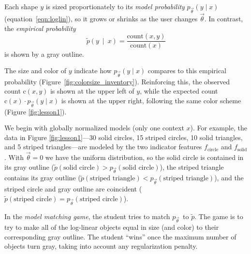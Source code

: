 \documentclass[11pt,letterpaper]{article}
\newcommand{\Note}[1]{}
\renewcommand{\Note}[1]{\hl{[#1]}}  %
\newcommand{\NoteSigned}[3]{{\sethlcolor{#2}\Note{#1: #3}}}
\newcommand{\NoteJE}[1]{\NoteSigned{JE}{LightGreen}{#1}}
\newcommand{\Commented}[1]{#1}
\newcommand{\empirical}[0]{\ensuremath{\tilde{p}}}
\begin{document}

Each shape $y$ is sized proportionately to its {\em model
probability} $p_{\vec{\theta}}(y \mid x)$ (equation~\eqref{eqn:loglin}), so it grows or shrinks as the user changes
$\vec{\theta}$.  
In contrast, the {\em empirical probability} 
\begin{equation}
\empirical\left(y\ \mid\ x\right) = \frac{\text{count}(x,y)}{\text{count}(x)} 
\label{eqn:empirical_distr}
\end{equation} 
is shown by a gray outline.

The size and color of $y$  indicate how $p_{\vec{\theta}}(y\mid x)$ compares to 
this empirical probability (Figure~\ref{fig:colorsize_inventory}).  
Reinforcing this, the observed count $\text{c}(x,y)$ is shown at the upper
left of $y$, while the expected count $\text{c}(x)\cdot
p_{\vec{\theta}}(y\mid x)$ is shown at the upper right, following the same color 
scheme (Figure \ref{fig:lesson1}). 

We begin with globally normalized models (only one 
context $x$).  For example, the data in Figure \ref{fig:lesson1}---30 solid
circles, 15 striped circles, 10 solid triangles, and 5 striped
triangles---are modeled by the two indicator features
$f_{\textrm{circle}}$ and $f_{\textrm{solid}}$. With $\vec{\theta} =
0$ we have the uniform distribution, so the solid circle is contained
in its gray outline ($\empirical{}(\textrm{solid circle}) >
p_{\vec{\theta}}(\textrm{solid circle})$), the striped triangle
contains its gray outline ($\empirical{}(\textrm{striped triangle}) <
p_{\vec{\theta}}(\textrm{striped triangle})$), and the striped
circle and gray outline are coincident ($\empirical{}(\textrm{striped
  circle}) = p_{\vec{\theta}}(\textrm{striped circle})$).

In the \textit{model matching game}, the student tries to match $p_{\vec{\theta}}$\ to  $\tilde{p}$. 
The game is to try to make all of the log-linear objects 
equal in size (and color) to their corresponding gray outline. 
The student ``wins'' once the maximum number of objects turn gray, 
taking into account any regularization penalty.
\end{document}
